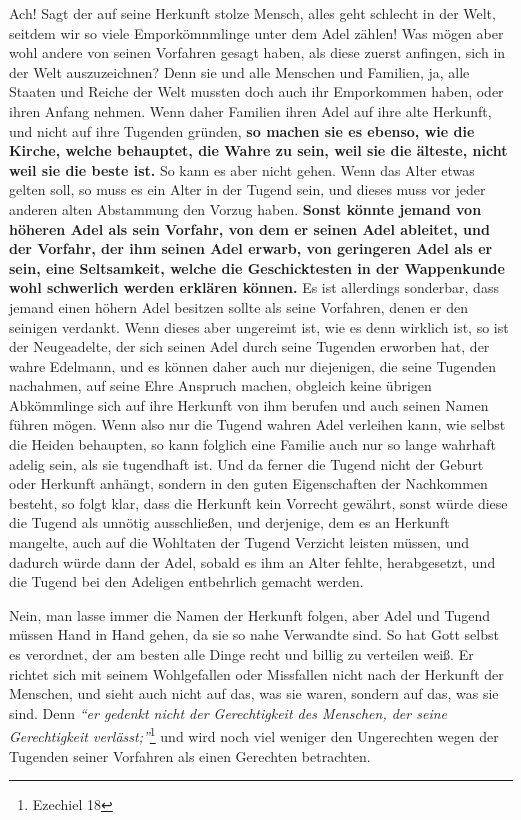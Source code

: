 Ach! Sagt der auf seine Herkunft stolze Mensch, alles geht schlecht in der Welt,
seitdem wir so viele Emporkömnmlinge unter dem
Adel
zählen! Was mögen aber wohl
andere von seinen Vorfahren gesagt haben, als diese zuerst anfingen, sich in der
Welt auszuzeichnen? Denn sie und alle Menschen und Familien, ja, alle Staaten
und Reiche der Welt mussten doch auch ihr Emporkommen haben, oder ihren Anfang
nehmen. Wenn daher Familien ihren Adel auf ihre alte Herkunft, und nicht auf
ihre
Tugenden gründen, \label{ref:11_04_abstammung} \textbf{so machen sie es ebenso,
wie  die Kirche, welche behauptet,
die Wahre zu sein, weil sie die älteste, nicht weil sie die beste ist.} So kann
es aber nicht gehen. Wenn das Alter etwas gelten soll, so muss es ein Alter in
der Tugend sein, und dieses muss vor jeder anderen alten Abstammung den Vorzug
haben. \textbf{Sonst könnte jemand von höheren Adel als sein Vorfahr, von dem er
seinen
Adel ableitet, und der Vorfahr, der ihm seinen Adel erwarb, von geringeren Adel
als er sein, eine Seltsamkeit, welche die Geschicktesten in der
Wappenkunde wohl
schwerlich werden erklären können.} Es ist allerdings sonderbar, dass jemand
einen höhern Adel besitzen sollte als seine Vorfahren, denen er den seinigen
verdankt. Wenn dieses aber ungereimt ist, wie es denn wirklich ist, so ist der
Neugeadelte, der sich seinen Adel durch seine Tugenden erworben hat, der wahre
Edelmann, und es können daher auch nur diejenigen, die seine Tugenden
nachahmen, auf seine Ehre Anspruch machen, obgleich keine übrigen Abkömmlinge
sich auf ihre Herkunft von ihm berufen und auch seinen Namen führen mögen. Wenn
also nur die Tugend wahren Adel verleihen kann, wie selbst die
Heiden behaupten,
so kann folglich eine Familie auch nur so lange wahrhaft adelig sein, als sie
tugendhaft ist. Und da ferner die Tugend nicht der Geburt oder Herkunft anhängt,
sondern in den guten Eigenschaften der Nachkommen besteht, so folgt klar, dass
die Herkunft kein Vorrecht gewährt, sonst würde diese die Tugend als unnötig
ausschließen, und derjenige, dem es an Herkunft mangelte, auch auf die Wohltaten
der Tugend Verzicht leisten müssen, und dadurch würde dann der Adel, sobald es
ihm an Alter fehlte, herabgesetzt, und die Tugend bei den Adeligen entbehrlich
gemacht werden.

\medskip

Nein, man lasse immer die Namen der Herkunft folgen, aber Adel und Tugend müssen
Hand in Hand gehen, da sie so nahe Verwandte sind. So hat Gott selbst es
verordnet, der am besten alle Dinge recht und billig zu verteilen weiß. Er
richtet sich mit seinem Wohlgefallen oder Missfallen nicht nach der Herkunft der
Menschen, und sieht auch nicht auf das, was sie waren, sondern auf das, was sie
sind. Denn
\textit{"`er gedenkt nicht der Gerechtigkeit des Menschen, der seine
Gerechtigkeit verlässt;"'}\footnote{Ezechiel 18}
und wird noch viel weniger den
Ungerechten wegen der Tugenden seiner Vorfahren als einen Gerechten betrachten.

